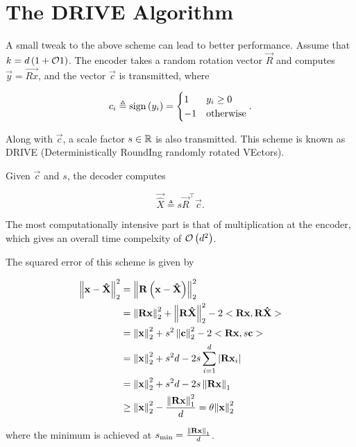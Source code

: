 \documentclass[twoside]{article}
\begin{document}
\section{The DRIVE Algorithm}

A small tweak to the above scheme can lead to better performance. Assume that
\(k = d\left(1+\mathcal O{1}\right)\). The encoder takes a random rotation vector \(\vec{R}\)
and computes \(\vec{y} = \vec{Rx}\), and the vector \(\vec{c}\) is transmitted,
where

\begin{equation}
    c_i \triangleq \mathrm{sign}\left(y_i\right) =
    \begin{cases}
        1 & y_i \ge 0 \\
        -1 & \mathrm{otherwise}
    \end{cases}.
    \label{eq:ci-def}
\end{equation}

Along with \(\vec{c}\), a scale factor \(s\in\mathbb R\) is also transmitted. This
scheme is known as DRIVE (Deterministically RoundIng randomly rotated VEctors).

Given \(\vec{c}\) and \(s\), the decoder computes

\begin{equation}
    \vec{\hat{X}} \triangleq s\vec{R}^\top\vec{c}.
    \label{eq:xhat-dec}
\end{equation}

The most computationally intensive part is that of multiplication at the 
encoder, which gives an overall time compelxity of \(\mathcal O\left(d^2\right)\).

The squared error of this scheme is given by

\begin{align}
    \left\lVert\boldsymbol{\mathbf{x}}-\boldsymbol{\mathbf{\hat{X}}}\right\rVert_2^2 &= \left\lVert\boldsymbol{\mathbf{R}}\left(\boldsymbol{\mathbf{x}}-\boldsymbol{\mathbf{\hat{X}}}\right)\right\rVert_2^2 \\
                                     &= \left\lVert\boldsymbol{\mathbf{Rx}}\right\rVert_2^2 + \left\lVert\boldsymbol{\mathbf{R\hat{X}}}\right\rVert_2^2 - 2<\boldsymbol{\mathbf{Rx}},\boldsymbol{\mathbf{R\hat{X}}}> \\
                                     &= \left\lVert\boldsymbol{\mathbf{x}}\right\rVert_2^2 + s^2\left\lVert\boldsymbol{\mathbf{c}}\right\rVert_2^2 - 2<\boldsymbol{\mathbf{Rx}},s\boldsymbol{\mathbf{c}}> \\
                                     &= \left\lVert\boldsymbol{\mathbf{x}}\right\rVert_2^2 + s^2d - 2s\sum_{i=1}^d\left\vert\boldsymbol{\mathbf{Rx}}_i\right\vert \\
                                     &= \left\lVert\boldsymbol{\mathbf{x}}\right\rVert_2^2 + s^2d - 2s\left\lVert\boldsymbol{\mathbf{Rx}}\right\rVert_1 \\
                                     &\ge \left\lVert\boldsymbol{\mathbf{x}}\right\rVert_2^2 - \frac{\left\lVert\boldsymbol{\mathbf{Rx}}\right\rVert_1^2}{d} = \theta{\left\lVert\boldsymbol{\mathbf{x}}\right\rVert_2^2}
\end{align}

where the minimum is achieved at \(s_{\mathrm{min}} =
\frac{\left\lVert\boldsymbol{\mathbf{Rx}}\right\rVert_1}{d}\).
\end{document}
